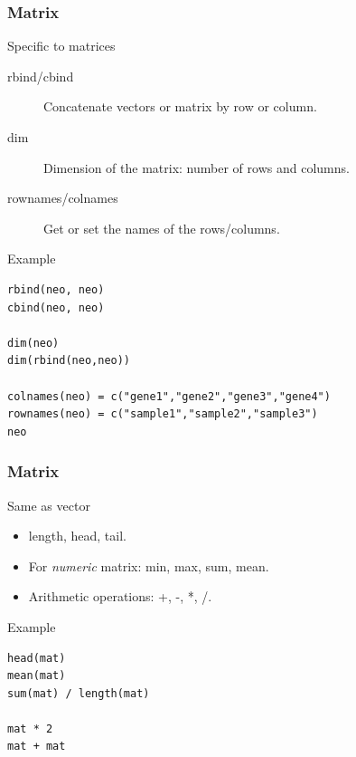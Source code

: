 \documentclass[10pt]{beamer}
\newenvironment{xframe}[2][]
  {\begin{frame}[fragile,environment=xframe,#1]
  \frametitle{#2}}
  {\end{frame}}
\begin{document}

\begin{xframe}{Matrix}
  \begin{block}{Specific to matrices}
    \begin{description}
    \item[rbind/cbind] Concatenate {\sf vector}s or {\sf matrix} by row or column.
    \item[dim] Dimension of the {\sf matrix}: number of rows and columns.
    \item[rownames/colnames] Get or set the names of the rows/columns.
    \end{description}    
  \end{block}
  \begin{exampleblock}{Example}
\begin{verbatim}
rbind(neo, neo)
cbind(neo, neo)

dim(neo)
dim(rbind(neo,neo))

colnames(neo) = c("gene1","gene2","gene3","gene4")
rownames(neo) = c("sample1","sample2","sample3")
neo
\end{verbatim}
  \end{exampleblock}
\end{xframe}


\begin{xframe}{Matrix}
  \begin{block}{Same as {\sf vector}}
    \begin{itemize}
    \item {\sf length}, {\sf head}, {\sf tail}.
    \item For {\it numeric} {\sf matrix}: {\sf min}, {\sf max}, {\sf sum}, {\sf mean}.
    \item Arithmetic operations: +, -, *, /.
    \end{itemize}
  \end{block}
  \begin{exampleblock}{Example}
\begin{verbatim}
head(mat)
mean(mat)
sum(mat) / length(mat)

mat * 2
mat + mat
\end{verbatim}
  \end{exampleblock}
\end{xframe}
\end{document}
